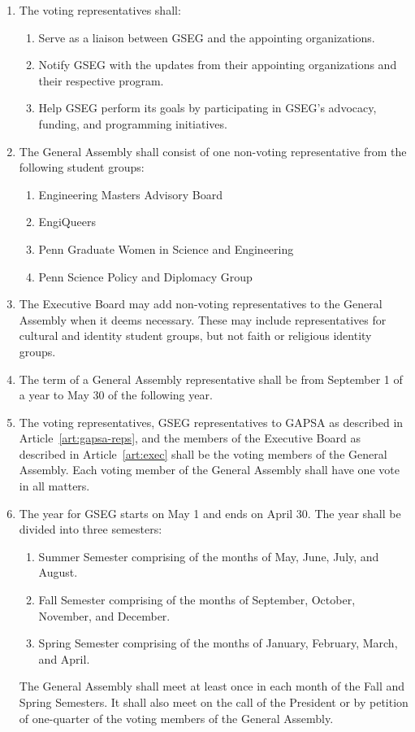 \begin{enumerate}[label=\Alph*.]
	\item The voting representatives shall:
	\begin{enumerate}
		\item Serve as a liaison between GSEG and the appointing organizations.
		\item Notify GSEG with the updates from their appointing organizations and their
		respective program.
		\item Help GSEG perform its goals by participating in GSEG's advocacy, funding,
		and programming initiatives.
	\end{enumerate}

	\item The General Assembly shall consist of one non-voting representative from the following
	student groups:
	\begin{enumerate}[label=(\roman*)]
		\item Engineering Masters Advisory Board
		\item EngiQueers
		\item Penn Graduate Women in Science and Engineering
		\item Penn Science Policy and Diplomacy Group
	\end{enumerate}

	\item The Executive Board may add non-voting representatives to the General Assembly 
	when it deems necessary. These may include representatives for cultural and identity
	student groups, but	not faith or religious identity groups.  

	\item The term of a General Assembly representative shall be from September 1 of a year to 
	May 30 of the following year. 

	\item The voting representatives, GSEG representatives to GAPSA as described in 
	Article~\ref{art:gapsa-reps}, and the members of the Executive Board as described in 
	Article~\ref{art:exec} shall be the voting members of the General Assembly. Each voting member
	of the General Assembly	shall have one vote in all matters. 

	\item The year for GSEG starts on May 1 and ends on April 30. The year shall be divided into three semesters:
	\begin{enumerate}[label=(\roman*)]
		\item Summer Semester comprising of the months of May, June, July, and August. 
		\item Fall Semester comprising of the months of September, October, November, and December.
		\item Spring Semester comprising of the months of January, February, March, and April.
	\end{enumerate}
	The General Assembly shall meet at least once in each month of the Fall and Spring Semesters.
	It shall also meet on the call of the President or by petition of one-quarter of the voting
	members of the General Assembly.


\end{enumerate}
